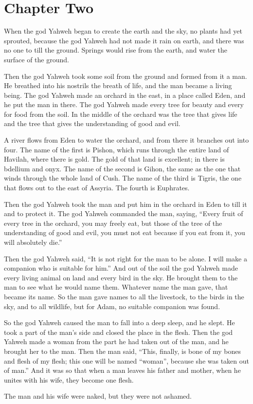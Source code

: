 \chapter*{Chapter Two}

When the god Yahweh began to create the earth and the sky, no plants had yet 
sprouted, because the god Yahweh had not made it rain on earth, 
and there was no one to till the ground. Springs would rise from the earth, 
and water the surface of the ground.

Then the god Yahweh took some soil from the ground and formed from it a man. 
He breathed into his nostrils the breath of life, and the man became 
a living being. The god Yahweh made an orchard in the east, in a place called 
Eden, and he put the man in there. The god Yahweh made every tree for beauty 
and every for food from the soil. In the middle of the orchard was the tree that
gives life and the tree that gives the understanding of good and evil.

A river flows from Eden to water the orchard, and from there it branches out 
into four. The name of the first is Pishon, which runs through the entire land 
of Havilah, where there is gold. The gold of that land is excellent; in there is 
bdellium and onyx. The name of the second is Gihon, the same as the one that 
winds through the whole land of Cush. The name of the third is Tigris, the one 
that flows out to the east of Assyria. The fourth is Euphrates.

Then the god Yahweh took the man and put him in the orchard in Eden to till it 
and to protect it. The god Yahweh commanded the man, saying, 
\enquote{Every fruit of every tree in the orchard, you may freely eat, but 
those of the tree of the understanding of good and evil, you must not eat 
because if you eat from it, you will absolutely die.}

Then the god Yahweh said, \enquote{It is not right for the man to be alone. 
I will make a companion who is suitable for him.} And out of the soil the god 
Yahweh made every living animal on land and every bird in the sky. He brought 
them to the man to see what he would name them. Whatever name the man gave, 
that became its name. So the man gave names to all the livestock, to the birds 
in the sky, and to all wildlife, but for Adam, no suitable companion was found.

So the god Yahweh caused the man to fall into a deep sleep, and he slept. He 
took a part of the man’s side and closed the place in the flesh. Then the god 
Yahweh made a woman from the part he had taken out of the man, and he brought 
her to the man. Then the man said, \enquote{This, finally, is bone of my bones 
and flesh of my flesh; this one will be named “woman”, because she was taken out 
of man.} And it was so that when a man leaves his father and mother, when he 
unites with his wife, they become one flesh. 

The man and his wife were naked, but they were not ashamed.

